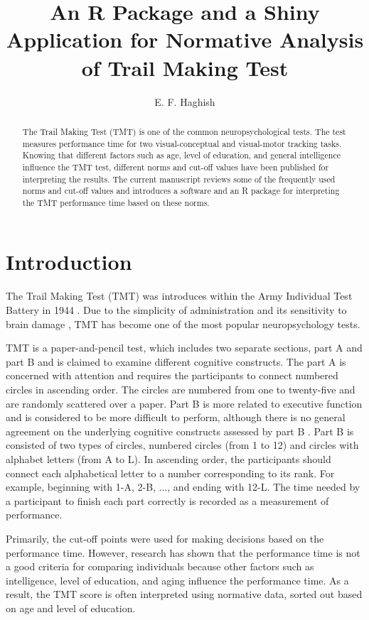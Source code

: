 \documentclass[]{article}
\title{An R Package and a Shiny Application for Normative Analysis of Trail Making Test}
\author{
	E. F. Haghish %
}
\begin{document}
\maketitle

\begin{abstract}
	The Trail Making Test (TMT) is one of the common neuropsychological tests. The test measures performance time for two visual-conceptual and visual-motor tracking tasks. Knowing that different factors such as age, level of education, and general intelligence influence the TMT test, different norms and cut-off values have been published for interpreting the results. The current manuscript reviews some of the frequently used norms and cut-off values and introduces a software and an R package for interpreting the TMT performance time based on these norms.  
\end{abstract}

\section{Introduction}
	The Trail Making Test (TMT) was introduces within the Army Individual Test Battery in 1944 \cite{reitan1985halstead}. Due to the simplicity of administration and its sensitivity to brain damage \cite{reitan1955relation}, TMT has become one of the most popular neuropsychology tests. 
	
	TMT is a paper-and-pencil test, which includes two separate sections, part A and part B and is claimed to examine different cognitive constructs. The part A is concerned with attention \cite{seo2006} and requires the participants to connect numbered circles in ascending order. The circles are numbered from one to twenty-five and are randomly scattered over a paper. Part B is more related to executive function \cite{ble2005, seo2006} and is considered to be more difficult to perform, although there is no general agreement on the underlying cognitive constructs assessed by part B \cite{kortte2002}. Part B is consisted of two types of circles, numbered circles (from 1 to 12) and circles with alphabet letters (from A to L). In ascending order, the participants should connect each alphabetical letter to a number corresponding to its rank. For example, beginning with 1-A, 2-B, ..., and ending with 12-L. The time needed by a participant to finish each part correctly is recorded as a measurement of performance. 
	
	Primarily, the cut-off points were used for making decisions based on the performance time. However, research has shown that the performance time is not a good criteria for comparing individuals because other factors such as intelligence, level of education, and aging influence the performance time. As a result, the TMT score is often interpreted using normative data, sorted out based on age and level of education. 
    
\end{document}
